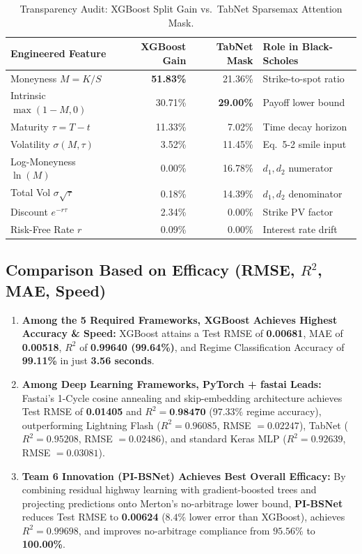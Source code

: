 \documentclass[10pt,twocolumn]{article}
\begin{document}
\begin{table}[h]
\centering
\caption{Transparency Audit: XGBoost Split Gain vs.\ TabNet Sparsemax Attention Mask.}
\label{tab:transparency}
\footnotesize
\setlength{\tabcolsep}{4.5pt}
\begin{tabular}{@{}lrrl@{}}
\toprule
\textbf{Engineered Feature} & \textbf{XGBoost Gain} & \textbf{TabNet Mask} & \textbf{Role in Black-Scholes} \\
\midrule
Moneyness $M = K/S$ & \textbf{51.83\%} & 21.36\% & Strike-to-spot ratio \\
Intrinsic $\max(1-M,0)$ & 30.71\% & \textbf{29.00\%} & Payoff lower bound \\
Maturity $\tau = T-t$ & 11.33\% & 7.02\% & Time decay horizon \\
Volatility $\sigma(M,\tau)$ & 3.52\% & 11.45\% & Eq.\ 5-2 smile input \\
Log-Moneyness $\ln(M)$ & 0.00\% & 16.78\% & $d_1, d_2$ numerator \\
Total Vol $\sigma\sqrt{\tau}$ & 0.18\% & 14.39\% & $d_1, d_2$ denominator \\
Discount $e^{-r\tau}$ & 2.34\% & 0.00\% & Strike PV factor \\
Risk-Free Rate $r$ & 0.09\% & 0.00\% & Interest rate drift \\
\bottomrule
\end{tabular}
\end{table}

\subsection{Comparison Based on Efficacy (RMSE, $R^2$, MAE, Speed)}
\begin{enumerate}
    \item \textbf{Among the 5 Required Frameworks, XGBoost Achieves Highest Accuracy \& Speed:} XGBoost attains a Test RMSE of \textbf{0.00681}, MAE of \textbf{0.00518}, $R^2$ of \textbf{0.99640 (99.64\%)}, and Regime Classification Accuracy of \textbf{99.11\%} in just \textbf{3.56 seconds}.
    \item \textbf{Among Deep Learning Frameworks, PyTorch + fastai Leads:} Fastai's 1-Cycle cosine annealing and skip-embedding architecture achieves Test RMSE of \textbf{0.01405} and $R^2 = \textbf{0.98470}$ ($97.33\%$ regime accuracy), outperforming Lightning Flash ($R^2 = 0.96085$, RMSE $= 0.02247$), TabNet ($R^2 = 0.95208$, RMSE $= 0.02486$), and standard Keras MLP ($R^2 = 0.92639$, RMSE $= 0.03081$).
    \item \textbf{Team 6 Innovation (PI-BSNet) Achieves Best Overall Efficacy:} By combining residual highway learning with gradient-boosted trees and projecting predictions onto Merton's no-arbitrage lower bound, \textbf{PI-BSNet} reduces Test RMSE to \textbf{0.00624} ($8.4\%$ lower error than XGBoost), achieves \textbf{$R^2 = 0.99698$}, and improves no-arbitrage compliance from $95.56\%$ to \textbf{100.00\%}.
\end{enumerate}
\end{document}
